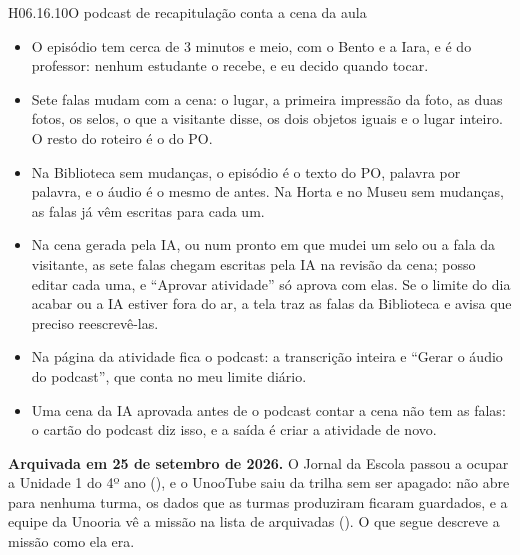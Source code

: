 \begin{historia}{H06.16.10}{O podcast de recapitulação conta a cena da aula}{\pronto}
\aceite
\begin{itemize}
  \item O episódio tem cerca de 3 minutos e meio, com o Bento e a Iara, e é
    do professor: nenhum estudante o recebe, e eu decido quando tocar.
  \item Sete falas mudam com a cena: o lugar, a primeira impressão da foto, as
    duas fotos, os selos, o que a visitante disse, os dois objetos iguais e o
    lugar inteiro. O resto do roteiro é o do PO.
  \item Na Biblioteca sem mudanças, o episódio é o texto do PO, palavra por
    palavra, e o áudio é o mesmo de antes. Na Horta e no Museu sem mudanças,
    as falas já vêm escritas para cada um.
  \item Na cena gerada pela IA, ou num pronto em que mudei um selo ou a fala
    da visitante, as sete falas chegam escritas pela IA na revisão da cena;
    posso editar cada uma, e \enquote{Aprovar atividade} só aprova com elas.
    Se o limite do dia acabar ou a IA estiver fora do ar, a tela traz as
    falas da Biblioteca e avisa que preciso reescrevê-las.
  \item Na página da atividade fica o podcast: a transcrição inteira e
    \enquote{Gerar o áudio do podcast}, que conta no meu limite diário.
  \item Uma cena da IA aprovada antes de o podcast contar a cena não tem as
    falas: o cartão do podcast diz isso, e a saída é criar a atividade de
    novo.
\end{itemize}
\end{historia}


\begin{nota}
\textbf{Arquivada em 25 de setembro de 2026.} O Jornal da Escola passou a ocupar
a Unidade 1 do 4º ano (), e o UnooTube saiu da trilha sem ser
apagado: não abre para nenhuma turma, os dados que as turmas produziram ficaram
guardados, e a equipe da Unooria vê a missão na lista de arquivadas
(). O que segue descreve a missão como ela era.
\end{nota}

